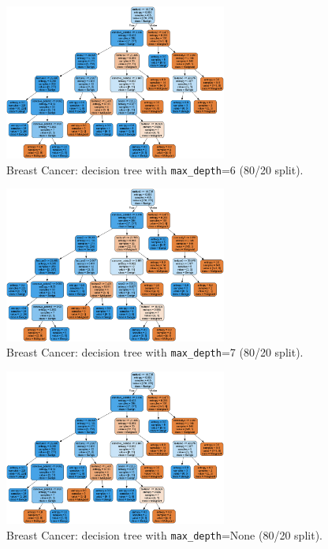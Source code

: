 \begin{figure}[H]
	\centering
	\includegraphics[width=0.65\textwidth]{imgs/dt-mini/dt__breast_cancer__80_vs_20__6.png}
	\caption{Breast Cancer: decision tree with \texttt{max\_depth}=6 (80/20 split).}\label{fig:bc-dt-depth-6}
\end{figure}

\begin{figure}[H]
	\centering
	\includegraphics[width=0.65\textwidth]{imgs/dt-mini/dt__breast_cancer__80_vs_20__7.png}
	\caption{Breast Cancer: decision tree with \texttt{max\_depth}=7 (80/20 split).}\label{fig:bc-dt-depth-7}
\end{figure}

\begin{figure}[H]
	\centering
	\includegraphics[width=0.65\textwidth]{imgs/dt-mini/dt__breast_cancer__80_vs_20__None.png}
	\caption{Breast Cancer: decision tree with \texttt{max\_depth}=None (80/20 split).}\label{fig:bc-dt-depth-none}
\end{figure}

